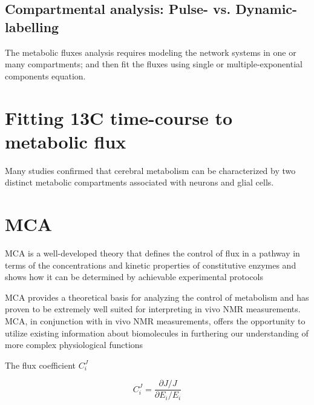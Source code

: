 \subsection{Compartmental analysis: Pulse- vs. Dynamic- labelling}

The metabolic fluxes analysis requires modeling the network systems in one or
many compartments; and then fit the fluxes using single or multiple-exponential
components equation.


\section{Fitting 13C time-course to metabolic flux}

Many studies confirmed that cerebral metabolism can be characterized by two
distinct metabolic compartments associated with neurons and glial cells.


\section{MCA}
\label{sec:MCA}

MCA is a well-developed theory that defines the control of flux in a pathway in
terms of the concentrations and kinetic properties of constitutive enzymes and
shows how it can be determined by achievable experimental protocols


MCA provides a theoretical basis for analyzing the control of metabolism and
has proven to be extremely well suited for interpreting in vivo NMR
measurements. MCA, in conjunction with in vivo NMR measurements, offers the
opportunity to utilize existing information about biomolecules in furthering our
understanding of more complex physiological functions


The flux coefficient $C^J_i$

\begin{equation}
C^J_i = \frac{\partial J/J}{\partial E_i/E_i}
\end{equation}


